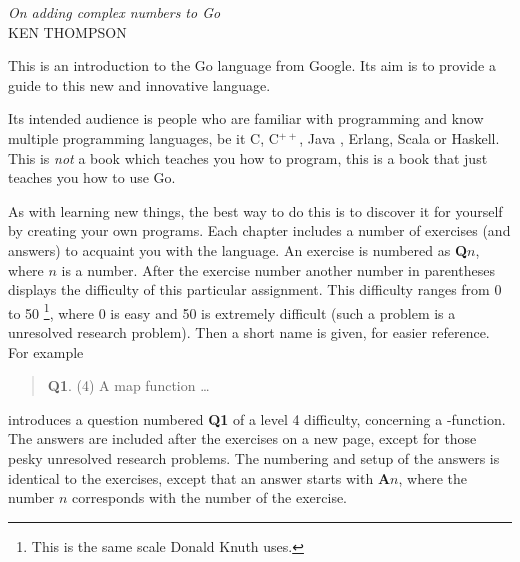 {\textit{On adding complex numbers to Go}\\ \textsc{KEN THOMPSON}}

\noindent{}This is an introduction to the Go language from Google. Its aim
is to provide a guide to this new and innovative language. 

Its intended audience is people who are familiar with programming
and know multiple programming languages, be it C\cite{c}, C$^{++}$\cite{c++}, 
Java \cite{java}, Erlang\cite{erlang}, Scala\cite{scala} or
Haskell\cite{haskell}. This is \emph{not} a book which teaches you how to 
program, this is a book that just teaches you how to use Go.

As with
learning new things, the best way to do this is to discover it for
yourself by creating your own programs.
Each chapter includes a number of exercises (and answers)
to acquaint you with the language.
An exercise
is numbered as \textbf{Q$n$}, where $n$ is a number. After the
exercise number another number in parentheses displays the difficulty
of this particular assignment. This difficulty ranges from 0 to
50 \footnote{This is the same scale Donald Knuth uses.}, where
0 is easy and 50 is extremely difficult (such a problem is a unresolved
research problem). Then a short name is given, for easier reference.
For example
\begin{verse}
\textbf{Q1}. (4) A map function \ldots
\end{verse}
    
introduces a question numbered \textbf{Q1} of a level 4 difficulty, concerning a
-function. The answers are included after the exercises on a
new page, except for those pesky unresolved research problems.
The numbering and setup of the answers is identical to the
exercises, except that an answer starts with \textbf{A$n$}, where the
number $n$ corresponds with the number of the exercise.

